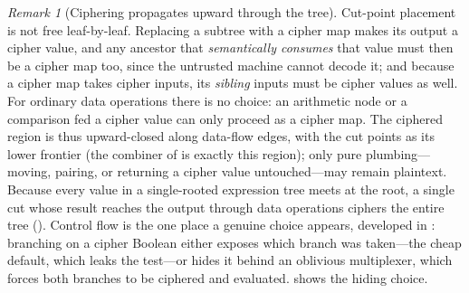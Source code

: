 \documentclass[11pt]{article}
\theoremstyle{definition}
\theoremstyle{plain}
\theoremstyle{remark}
\newtheorem{remark}{Remark}[section]
\begin{document}
\begin{remark}[Ciphering propagates upward through the tree]
\label{rem:cipher-propagation}
Cut-point placement is not free leaf-by-leaf.
Replacing a subtree with a cipher map makes its output a cipher value,
and any ancestor that \emph{semantically consumes} that value must then
be a cipher map too, since the untrusted machine cannot decode it; and
because a cipher map takes cipher inputs, its \emph{sibling} inputs must
be cipher values as well.
For ordinary data operations there is no choice: an arithmetic node or a
comparison fed a cipher value can only proceed as a cipher map.
The ciphered region is thus upward-closed along data-flow edges, with
the cut points as its lower frontier (the combiner of
 is exactly this region); only pure
plumbing---moving, pairing, or returning a cipher value untouched---may
remain plaintext.
Because every value in a single-rooted expression tree meets at the
root, a single cut whose result reaches the output through data
operations ciphers the entire tree ().
Control flow is the one place a genuine choice appears, developed in
: branching on a cipher Boolean either exposes which
branch was taken---the cheap default, which leaks the test---or hides it
behind an oblivious multiplexer, which forces both branches to be
ciphered and evaluated.
 shows the hiding choice.
\end{remark}
\end{document}
